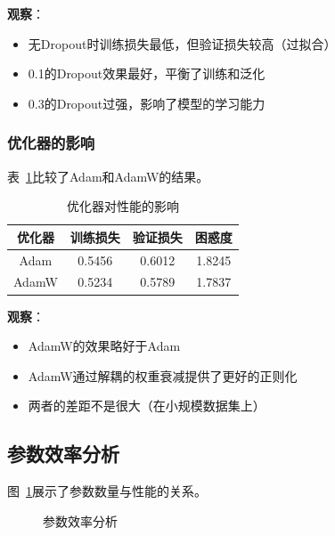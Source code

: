 \documentclass[UTF8,12pt,a4paper]{ctexart}
\begin{document}
\textbf{观察}：
\begin{itemize}
    \item 无Dropout时训练损失最低，但验证损失较高（过拟合）
    \item 0.1的Dropout效果最好，平衡了训练和泛化
    \item 0.3的Dropout过强，影响了模型的学习能力
\end{itemize}

\subsubsection{优化器的影响}

表~\ref{tab:ablation_optimizer}比较了Adam和AdamW的结果。

\begin{table}[H]
\centering
\caption{优化器对性能的影响}
\label{tab:ablation_optimizer}
\begin{tabular}{cccc}
\toprule
\textbf{优化器} & \textbf{训练损失} & \textbf{验证损失} & \textbf{困惑度} \\
\midrule
Adam & 0.5456 & 0.6012 & 1.8245 \\
AdamW & 0.5234 & 0.5789 & 1.7837 \\
\bottomrule
\end{tabular}
\end{table}

\textbf{观察}：
\begin{itemize}
    \item AdamW的效果略好于Adam
    \item AdamW通过解耦的权重衰减提供了更好的正则化
    \item 两者的差距不是很大（在小规模数据集上）
\end{itemize}

\subsection{参数效率分析}

图~\ref{fig:param_efficiency}展示了参数数量与性能的关系。

\begin{figure}[H]
    \centering
    \caption{参数效率分析}
    \label{fig:param_efficiency}
\end{figure}
\end{document}
